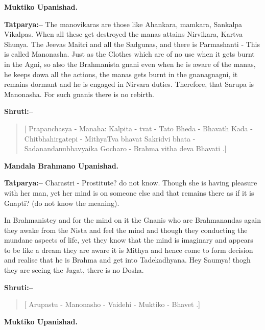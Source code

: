 \begin{flushright}
\textbf{Muktiko Upanishad.}
\end{flushright}

\textbf{Tatparya:–} The manovikaras are those like Ahankara, mamkara, Sankalpa Vikalpas. When all these get destroyed the manas attains Nirvikara, Kartva Shunya. The Jeevas Maitri and all the Sadgunas, and there is Parmashanti - This is called Manonasha. Just as the Clothes which are of no use when it gets burnt in the Agni, so also the Brahmanista gnani even when he is aware of the manas, he keeps dowa all the actions, the manas gets burnt in the gnanagnagni, it remains dormant and he is engaged in Nirvara duties. Therefore, that Sarupa is Manonasha. For such gnanis there is no rebirth.

\textbf{Shruti:–}

\begin{verse}
[ Prapanchasya - Manaha: Kalpita - tvat - Tato Bheda - Bhavath  Kada - Chitbhahirgatepi - MithyaTva bhavat Sakridvi bhata - Sadanandanubhavyaika Gocharo - Brahma vitha deva Bhavati .]
\end{verse}

\begin{flushright}
\textbf{Mandala Brahmano Upanishad.}
\end{flushright}

\textbf{Tatparya:–} Charastri - Prostitute? do not know. Though she is having pleasure with her man, yet her mind is on someone else and that remains there as if it is Gnapti? (do not know the meaning).

In Brahmanistey and for the mind on it the Gnanis who are Brahmanandas again they awake from the Nista and feel the mind and though they conducting the mundane aspects of life, yet they know that the mind is imaginary and appears to be like a dream they are aware it is Mithya and hence come to form decision and realise that he is Brahma and get into Tadekadhyana. Hey Saumya! thogh they are seeing the Jagat, there is no Dosha.

\textbf{Shruti:–}

\begin{verse}
[ Arupastu - Manonasho - Vaidehi - Muktiko - Bhavet .]
\end{verse}

\begin{flushright}
\textbf{Muktiko Upanishad.}
\end{flushright}

